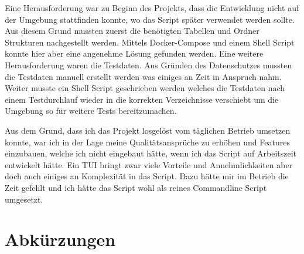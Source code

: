 \documentclass[a4paper,oneside, 12pt]{report}
\begin{document}
Eine Herausforderung war zu Beginn des Projekts, dass die Entwicklung nicht auf der Umgebung stattfinden konnte, wo das Script später verwendet werden sollte. Aus diesem Grund mussten zuerst die benötigten Tabellen und Ordner Strukturen nachgestellt werden. Mittels Docker-Compose und einem Shell Script konnte hier aber eine angenehme Lösung gefunden werden. Eine weitere Herausforderung waren die Testdaten. Aus Gründen des Datenschutzes mussten die Testdaten manuell erstellt werden was einiges an Zeit in Anspruch nahm. Weiter musste ein Shell Script geschrieben werden welches die Testdaten nach einem Testdurchlauf wieder in die korrekten Verzeichnisse verschiebt um die Umgebung so für weitere Tests bereitzumachen.

Aus dem Grund, dass ich das Projekt losgelöst vom täglichen Betrieb umsetzen konnte, war ich in der Lage meine Qualitätsansprüche zu erhöhen und Features einzubauen, welche ich nicht eingebaut hätte, wenn ich das Script auf Arbeitszeit entwickelt hätte. Ein \ac{TUI} bringt zwar viele Vorteile und Annehmlichkeiten aber doch auch einiges an Komplexität in das Script. Dazu hätte mir im Betrieb die Zeit gefehlt und ich hätte das Script wohl als reines Commandline Script umgesetzt.


\cleardoublepage
{}
{}
\chapter*{Abkürzungen}
\begin{acronym}[Abkürzungen]
\end{acronym}
\end{document}
